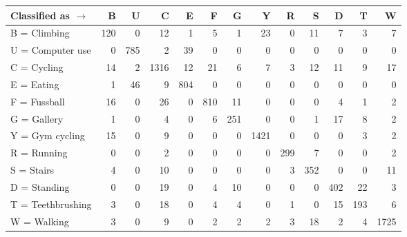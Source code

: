 \begin{tabular}{lrrrrrrrrrrrr}
\toprule
Classified as $\rightarrow$ &    B &    U &     C &    E &    F &    G &     Y &    R &    S &    D &    T &     W \\
\midrule
B = Climbing      &  120 &    0 &    12 &    1 &    5 &    1 &    23 &    0 &   11 &    7 &    3 &     7 \\
U = Computer use  &    0 &  785 &     2 &   39 &    0 &    0 &     0 &    0 &    0 &    0 &    0 &     0 \\
C = Cycling       &   14 &    2 &  1316 &   12 &   21 &    6 &     7 &    3 &   12 &   11 &    9 &    17 \\
E = Eating        &    1 &   46 &     9 &  804 &    0 &    0 &     0 &    0 &    0 &    0 &    0 &     0 \\
F = Fussball      &   16 &    0 &    26 &    0 &  810 &   11 &     0 &    0 &    0 &    4 &    1 &     2 \\
G = Gallery       &    1 &    0 &     4 &    0 &    6 &  251 &     0 &    0 &    1 &   17 &    8 &     2 \\
Y = Gym cycling   &   15 &    0 &     9 &    0 &    0 &    0 &  1421 &    0 &    0 &    0 &    3 &     2 \\
R = Running       &    0 &    0 &     2 &    0 &    0 &    0 &     0 &  299 &    7 &    0 &    0 &     2 \\
S = Stairs        &    4 &    0 &    10 &    0 &    0 &    0 &     0 &    3 &  352 &    0 &    0 &    11 \\
D = Standing      &    0 &    0 &    19 &    0 &    4 &   10 &     0 &    0 &    0 &  402 &   22 &     3 \\
T = Teethbrushing &    3 &    0 &    18 &    0 &    4 &    4 &     0 &    1 &    0 &   15 &  193 &     6 \\
W = Walking       &    3 &    0 &     9 &    0 &    2 &    2 &     2 &    3 &   18 &    2 &    4 &  1725 \\
\bottomrule
\end{tabular}
